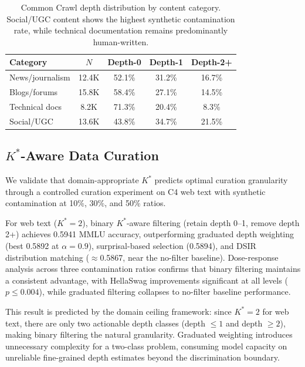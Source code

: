 \documentclass[11pt,a4paper]{article}
\newcommand{\kstar}{K^{*}}
\begin{document}
\begin{table}[t]
\centering
\caption{Common Crawl depth distribution by content category. Social/UGC content shows the highest synthetic contamination rate, while technical documentation remains predominantly human-written.}
\label{tab:cc_domains}
\small
\begin{tabular}{lcccc}
\toprule
\textbf{Category} & $N$ & \textbf{Depth-0} & \textbf{Depth-1} & \textbf{Depth-2+} \\
\midrule
News/journalism   & 12.4K & 52.1\% & 31.2\% & 16.7\% \\
Blogs/forums      & 15.8K & 58.4\% & 27.1\% & 14.5\% \\
Technical docs    &  8.2K & 71.3\% & 20.4\% &  8.3\% \\
Social/UGC        & 13.6K & 43.8\% & 34.7\% & 21.5\% \\
\bottomrule
\end{tabular}
\end{table}

\subsection{$\kstar$-Aware Data Curation}
\label{sec:curation}

We validate that domain-appropriate $\kstar$ predicts optimal curation granularity through a controlled curation experiment on C4 web text with synthetic contamination at 10\%, 30\%, and 50\% ratios.

For web text ($\kstar\!=\!2$), binary $\kstar$-aware filtering (retain depth 0--1, remove depth 2+) achieves 0.5941 MMLU accuracy, outperforming graduated depth weighting (best 0.5892 at $\alpha\!=\!0.9$), surprisal-based selection (0.5894), and DSIR distribution matching ($\approx$0.5867, near the no-filter baseline).
Dose-response analysis across three contamination ratios confirms that binary filtering maintains a consistent advantage, with HellaSwag improvements significant at all levels ($p \leq 0.004$), while graduated filtering collapses to no-filter baseline performance.

This result is predicted by the domain ceiling framework: since $\kstar\!=\!2$ for web text, there are only two actionable depth classes (depth $\leq 1$ and depth $\geq 2$), making binary filtering the natural granularity.
Graduated weighting introduces unnecessary complexity for a two-class problem, consuming model capacity on unreliable fine-grained depth estimates beyond the discrimination boundary.
\end{document}
